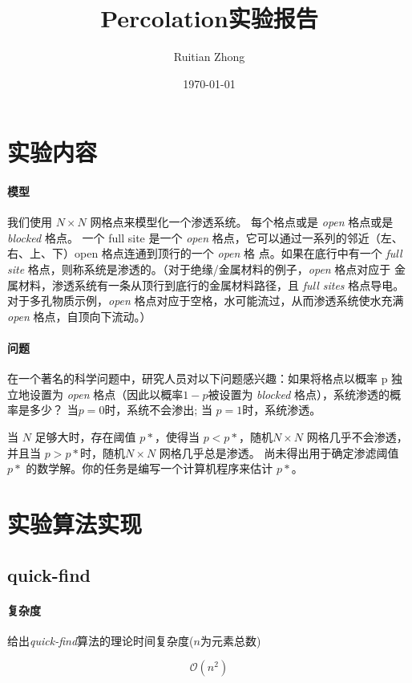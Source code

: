 \documentclass[12pt,a4paper]{ctexart}
\title{Percolation实验报告}
\author{Ruitian Zhong}
\date{\today}
\begin{document}
\maketitle
\section{实验内容}
\paragraph{模型}
我们使用 $N×N$ 网格点来模型化一个渗透系统。 每个格点或是 \textit{open} 格点或是 \textit{blocked} 格点。 一个
full site 是一个\textit{ open }格点，它可以通过一系列的邻近（左、右、上、下）open 格点连通到顶行的一个 \textit{open} 格
点。如果在底行中有一个 \textit{full site} 格点，则称系统是渗透的。（对于绝缘/金属材料的例子，\textit{open} 格点对应于
金属材料，渗透系统有一条从顶行到底行的金属材料路径，且\textit{ full sites }格点导电。对于多孔物质示例，\textit{open}
格点对应于空格，水可能流过，从而渗透系统使水充满\textit{ open }格点，自顶向下流动。）

\paragraph{问题}
在一个著名的科学问题中，研究人员对以下问题感兴趣：如果将格点以概率 p 独立地设置为\textit{ open}
格点（因此以概率$ 1-p $被设置为\textit{ blocked }格点），系统渗透的概率是多少？ 当$ p = 0 $时，系统不会渗出; 当
$p=1 $时，系统渗透。

  当 $N$ 足够大时，存在阈值 $ p* $，使得当 $p<p*$，随机$N×N$ 网格几乎不会渗透，并且当 $p> p*$时，随机$N×N$
网格几乎总是渗透。 尚未得出用于确定渗滤阈值 $ p* $ 的数学解。你的任务是编写一个计算机程序来估计
$p*$。


\section{实验算法实现}

\subsection{quick-find}
\paragraph{复杂度} 给出\textit{quick-find}算法的理论时间复杂度($n$为元素总数)

\begin{equation}
    \nonumber
    \mathcal{O}(n^2)
\end{equation} 
\end{document}
